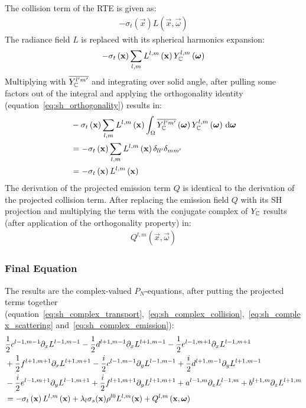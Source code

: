 The collision term of the RTE is given as:
\begin{align*}
-\sigma_t\left(\vec{x}\right)L\left(\vec{x}, \vec{\omega}\right)
\end{align*}
The radiance field $L$ is replaced with its spherical harmonics expansion:
\begin{align*}
-\sigma_t\left(\boldsymbol{\mathbf{x}}\right)
\sum_{l,m}
{
L^{l,m}\left(\boldsymbol{\mathbf{x}}\right )Y_{\mathbb{C}}^{l,m}\left(\boldsymbol{\mathbf{\omega}}\right)
}
\end{align*}
Multiplying with $\overline{Y_{\mathbb{C}}^{l'm'}}$ and integrating over solid angle, after pulling some factors out of the integral and applying the orthogonality identity (equation~\ref{eq:sh_orthogonality}) results in:
\begin{align}
&-\sigma_t\left(\boldsymbol{\mathbf{x}}\right)\sum_{l,m}{L^{l,m}\left(\boldsymbol{\mathbf{x}}\right )\int_\Omega\overline{Y_{\mathbb{C}}^{l'm'}}\left(\boldsymbol{\mathbf{\omega}}\right)Y_{\mathbb{C}}^{l,m}\left(\boldsymbol{\mathbf{\omega}}\right)\,\mathrm{d}\boldsymbol{\mathbf{\omega}}}
\nonumber
\\
&= -\sigma_t\left(\boldsymbol{\mathbf{x}}\right)\sum_{l,m}{L^{l,m}\left(\boldsymbol{\mathbf{x}}\right )\delta_{ll'}\delta_{mm'}}
\nonumber
\\
&= -\sigma_t\left(\boldsymbol{\mathbf{x}}\right)L^{l,m}\left(\boldsymbol{\mathbf{x}}\right )
\label{eq:sh_complex_collision}
\end{align}
The derivation of the projected emission term $Q$ is identical to the derivation of the projected collision term. After replacing the emission field $Q$ with its SH projection and multiplying the term with the conjugate complex of $Y_{\mathbb{C}}$ results (after application of the orthogonality property) in:
\begin{align}
Q^{l,m}\left(\vec{x}, \vec{\omega}\right)
\label{eq:sh_complex_emission}
\end{align}


\subsubsection*{Final Equation}

The results are the complex-valued $P_N$-equations, after putting the projected terms together (equation~\ref{eq:sh_complex_transport},~\ref{eq:sh_complex_collision},~\ref{eq:sh_complex_scattering} and~\ref{eq:sh_complex_emission}):
\begin{align}
&
\frac{1}{2}c^{l-1, m-1}\partial_x L^{l-1,m-1}
-\frac{1}{2}d^{l+1, m-1}\partial_x L^{l+1,m-1}
-\frac{1}{2}e^{l-1, m+1}\partial_x L^{l-1,m+1}
\nonumber
\\
&
+\frac{1}{2}f^{l+1, m+1}\partial_x L^{l+1,m+1}
-\frac{i}{2}c^{l-1, m-1}\partial_y L^{l-1,m-1}
+\frac{i}{2}d^{l+1, m-1}\partial_y L^{l+1,m-1}
\nonumber
\\
&
-\frac{i}{2}e^{l-1, m+1}\partial_y L^{l-1,m+1}
+\frac{i}{2}f^{l+1, m+1}\partial_y L^{l+1,m+1}
+a^{l-1, m}\partial_z L^{l-1,m}
+b^{l+1, m}\partial_z L^{l+1,m}
\nonumber
\\
&
=
-\sigma_t\left(\boldsymbol{\mathbf{x}}\right)L^{l,m}\left(\boldsymbol{\mathbf{x}}\right )
+
\lambda_l
\sigma_s(\boldsymbol{\mathbf{x}})
\rho^{l0}L^{l,m}(\boldsymbol{\mathbf{x}}) + Q^{l,m}\left(\boldsymbol{\mathbf{x}}, \boldsymbol{\mathbf{\omega}}\right)
\label{eq:sh_pne_complex}
\end{align}